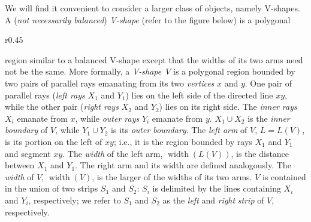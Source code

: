 \documentclass{llncs}
\DeclareMathOperator{\width}{width}
\begin{document}
We will find it convenient to consider a larger class of objects,
namely V-shapes. A (\emph{not necessarily balanced}) \emph{V-shape} (refer to the
figure below) is a polygonal
\begin{wrapfigure}[9]{r}{0.45\textwidth}
\end{wrapfigure}
region similar to a balanced V-shape except that the widths of its two
arms need not be the same.  More formally, a \emph{V-shape}~$V$ is a
polygonal region bounded by two pairs of parallel rays emanating from
its two \emph{vertices} $x$ and $y$.  One pair of parallel rays
(\emph{left rays} $X_1$ and $Y_1$) lies on the left side of the
directed line $xy$, while the other pair (\emph{right rays} $X_2$ and
$Y_2$) lies on its right side.  The \emph{inner rays} $X_i$ emanate
from $x$, while \emph{outer rays} $Y_i$ emanate from $y$.  $X_1\cup
X_2$ is the \emph{inner boundary} of $V$, while $Y_1\cup Y_2$ is its
\emph{outer boundary}.  The \emph{left arm} of $V$, $L=L(V)$, is its
portion on the left of $xy$; i.e., it is the region bounded by rays
$X_1$ and $Y_1$ and segment $xy$.  The \emph{width} of the left arm,
$\width(L(V))$, is the distance between $X_1$ and $Y_1$.  The right
arm and its width are defined analogously.  The \emph{width} of $V$,
$\width(V)$, is the larger of the widths of its two arms.  $V$ is
contained in the union of two strips $S_1$ and $S_2$: $S_i$ is
delimited by the lines containing $X_i$ and $Y_i$, respectively; we
refer to $S_1$ and $S_2$ as the \emph{left} and \emph{right}
\emph{strip} of $V$, respectively.
\end{document}
